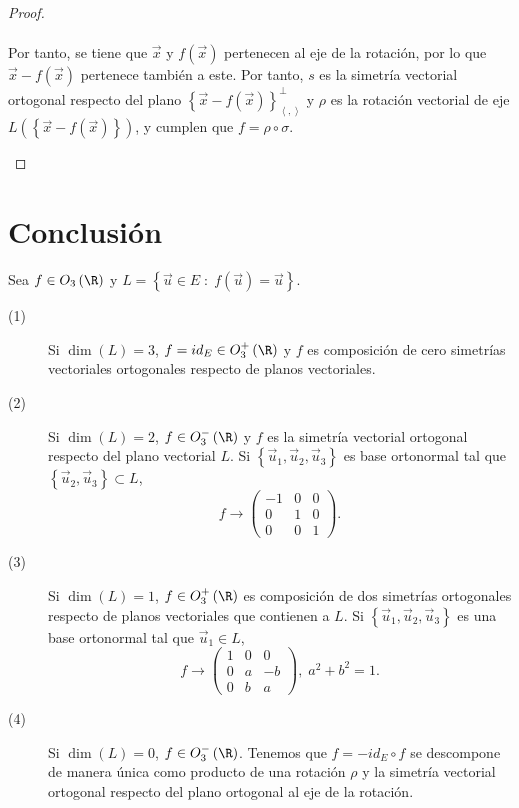 \begin{description}
\begin{proof}
\begin{description}
\[\begin{split}
\end{split}
\]
Por tanto, se tiene que $\displaystyle \vec{x} $ y $\displaystyle f\left(\vec{x}\right) $ pertenecen al eje de la rotación, por lo que $\displaystyle \vec{x} -f\left(\vec{x}\right) $ pertenece también a este. Por tanto, $\displaystyle s $ es la simetría vectorial ortogonal respecto del plano $\displaystyle \left\{ \vec{x}-f\left(\vec{x}\right)\right\} ^{\perp }_{\left\langle ,  \right\rangle } $ y $\displaystyle \rho $ es la rotación vectorial de eje $\displaystyle L\left( \left\{ \vec{x}-f\left(\vec{x}\right) \right\} \right)$, y cumplen que $\displaystyle f = \rho \circ \sigma  $.
	\end{description}
\end{proof}
\end{description}
\section*{Conclusión}
Sea $\displaystyle f \in O_{3}\left(\R\right) $ y $\displaystyle L = \left\{ \vec{u}\in E \; : \; f\left(\vec{u}\right) = \vec{u}\right\}  $.
\begin{description}
\item[(1)] Si $\displaystyle \dim\left(L\right) = 3 $, $\displaystyle f = id _{E} \in O^{+}_{3}\left(\R\right) $ y $\displaystyle f $ es composición de cero simetrías vectoriales ortogonales respecto de planos vectoriales.
\item[(2)] Si $\displaystyle \dim\left(L\right) = 2 $, $\displaystyle f \in O_{3}^{-}\left(\R\right) $ y $\displaystyle f $ es la simetría vectorial ortogonal respecto del plano vectorial $\displaystyle L $. Si $\displaystyle \left\{ \vec{u}_{1}, \vec{u}_{2}, \vec{u}_{3}\right\}  $ es base ortonormal tal que $\displaystyle \left\{ \vec{u}_{2}, \vec{u}_{3}\right\}\subset L $,
	\[f \to \begin{pmatrix} -1 & 0 & 0 \\
	0 & 1 & 0 \\
0 & 0 & 1\end{pmatrix} .\]
\item[(3)] Si $\displaystyle \dim\left(L\right) = 1 $, $\displaystyle f \in O^{+}_{3}\left(\R\right) $ es composición de dos simetrías ortogonales respecto de planos vectoriales que contienen a $\displaystyle L $. Si $\displaystyle \left\{ \vec{u}_{1}, \vec{u}_{2}, \vec{u}_{3}\right\}  $ es una base ortonormal tal que $\displaystyle \vec{u}_{1} \in L $,
		\[f \to \begin{pmatrix} 1 & 0 & 0 \\
		0 & a & - b \\
	0 & b & a\end{pmatrix}, \; a^{2} + b^{2} = 1 .\]
\item[(4)] Si $\displaystyle \dim\left(L\right)= 0 $, $\displaystyle f \in O^{-}_{3}\left(\R\right) $. Tenemos que $\displaystyle f = - id _{E} \circ f $ se descompone de manera única como producto de una rotación $\displaystyle \rho $ y la simetría vectorial ortogonal respecto del plano ortogonal al eje de la rotación. 
\end{description}

